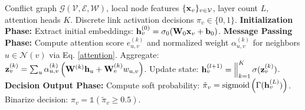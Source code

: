 \documentclass[journal]{IEEEtran}
\begin{document}
	\begin{algorithm}[tb]
		\caption{Distributed GAT-assisted Link Scheduling}
		\label{alg:scheduling}
		\begin{algorithmic}[1]
			\REQUIRE Conflict graph $\mathcal{G}(\mathcal{V}, \mathcal{E}, \mathcal{W})$, local node features $\{{\bf x}_v\}_{v\in\mathcal{V}}$, layer count $L$, attention heads $K$.
			\ENSURE Discrete link activation decisions $\pi_v \in \{0, 1\}$.
			\STATE \textbf{Initialization Phase:} 
			\STATE Extract initial embeddings: ${\bf h}_v^{(0)} = \sigma_0({\bf W}_0{\bf x}_v+{\bf b}_0)$.
			\STATE \textbf{Message Passing Phase:} 
			\STATE Compute attention score $e_{u,v}^{(k)}$ and normalized weight $\alpha_{u,v}^{(k)}$ for neighbors $u \in \mathcal{N}(v)$ via Eq. \eqref{attention}.
			\STATE Aggregate: \\${\bf z}_v^{(k)} = \sum_{u} \alpha_{u,v}^{(k)} \left({\bf W}^{(k)}{\bf h}_u + {\bf W}_{\mathrm{e}}^{(k)}w_{u,v}\right)$.
			\ENDFOR
			\STATE Update state: ${\bf h}_v^{(l+1)} = \mathop{\Big\Vert}_{k=1}^K \sigma({\bf z}_v^{(k)})$.
			\ENDFOR
			\ENDFOR
			\STATE \textbf{Decision Output Phase:} 
			\STATE Compute soft probability: $\tilde{\pi}_v = \mathrm{sigmoid}\left(\Gamma({\bf h}_v^{(L)})\right)$.
			\STATE Binarize decision: $\pi_v=\mathds{1}(\tilde{\pi}_v\ge 0.5)$.
			\ENDFOR
		\end{algorithmic}
	\end{algorithm}
	
\end{document}

